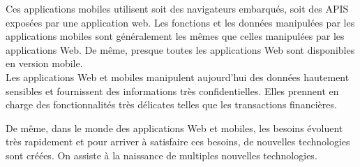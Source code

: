 Ces applications mobiles utilisent soit des navigateurs embarqués, soit des APIS exposées par une application web. Les fonctions et les données manipulées par les applications mobiles sont généralement les mêmes que celles manipulées par les applications Web. De même, presque toutes les applications Web sont disponibles en version mobile.\\
Les applications Web et mobiles manipulent aujourd'hui des données hautement sensibles et fournissent des informations très confidentielles. Elles prennent en charge des fonctionnalités très délicates telles que les transactions financières.
\begin{comment}
; il y a de cela quelques années, lorsqu’on voulait faire une transaction financière, il fallait aller à la banque et un agent le faisait pour vous alors qu’aujourd'hui, avec ces applications web, il est possible de faire ces transactions soit même en ligne en fournissant certaines informations. Ceci étant, si un attaquant arrivait à compromettre ce genre d’applications par exemple, il lui serait facile de faire des transactions frauduleuses et vider votre compte bancaire. Qu’un individu malintentionné arrive à compromettre ce genre d’applications représenterait de gros risques à la fois pour les propriétaires de ces applications dont le business repose essentiellement sur ces dernières mais aussi pour les utilisateurs qui auront fourni des informations très sensibles (mots de passe, numéros de carte de crédit entre autres). 
\end{comment}
De même, dans le monde des applications Web et mobiles, les besoins évoluent très rapidement et pour arriver à satisfaire ces besoins, de nouvelles technologies sont créées. On assiste à la naissance de multiples nouvelles technologies.
